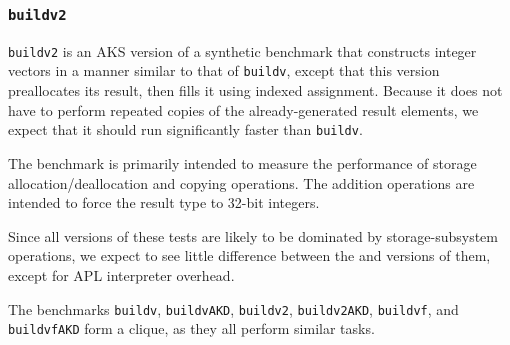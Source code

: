 \subsubsection{\tt buildv2}
\label{benchmarkbuildv2}

{\tt buildv2} is an AKS version of a synthetic benchmark that constructs integer
vectors in a manner similar to that of {\tt buildv}, except that
this version preallocates its result, then fills it using indexed
assignment. Because it does not have to perform repeated copies
of the already-generated result elements, we expect that it should
run significantly faster than {\tt buildv}.

The benchmark is primarily intended to measure the
performance of storage allocation/deallocation and
copying operations. The addition operations are
intended to force the result type to 32-bit integers.

Since all versions of these tests are likely to be dominated
by storage-subsystem operations, we expect to see little
difference between the \dapl and \sac versions of them,
except for APL interpreter overhead.

The benchmarks {\tt buildv}, {\tt buildvAKD}, {\tt buildv2}, {\tt buildv2AKD},
{\tt buildvf}, and {\tt buildvfAKD} form a clique, as they
all perform similar tasks.
